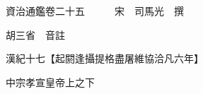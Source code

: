 










 


 
 


 

  
  
  
  
  





  
  
  
  
  
 
  

  

  
  
  



  

 
 

  
   




  

  
  


  　　資治通鑑卷二十五　　　宋　司馬光　撰

　　胡三省　音註

　　漢紀十七【起閼逢攝提格盡屠維協洽凡六年】

　　中宗孝宣皇帝上之下

